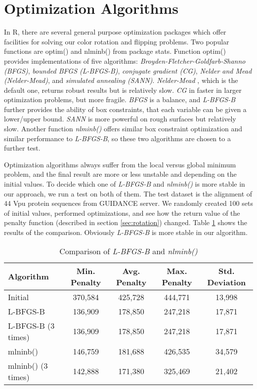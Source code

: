 \section{Optimization Algorithms}

In R, there are several general purpose optimization packages which offer facilities for solving our color rotation and flipping problems. Two popular functions are optim() and nlminb() from package stats. Function optim() provides implementations of five algorithms: \emph{Broyden-Fletcher-Goldfarb-Shanno (BFGS)}, \emph{bounded BFGS (L-BFGS-B)}, \emph{conjugate gradient (CG)}, \emph{Nelder and Mead (Nelder-Mead)}, and \emph{simulated annealing (SANN)}. \emph{Nelder-Mead} \cite{Nelder:1965aa}, which is the default one, returns robust results but is relatively slow. \emph{CG} \cite{Fletcher:1964aa} in faster in larger optimization problems, but more fragile. \emph{BFGS} is a balance, and \emph{L-BFGS-B} further provides the ability of box constraints, that each variable can be given a lower/upper bound. \emph{SANN} \cite{Belisle:1992aa} is more powerful on rough surfaces but relatively slow. Another function \emph{nlminb()} offers similar box constraint optimization and similar performance to \emph{L-BFGS-B}, so these two algorithms are chosen to a further test.

Optimization algorithms always suffer from the local versus global minimum problem, and the final result are more or less unstable and depending on the initial values. To decide which one of \emph{L-BFGS-B} and \emph{nlminb()} is more stable in our approach, we run a test on both of them. The test dataset is the alignment of 44 Vpu protein sequences from GUIDANCE server. \cite{Penn:2010ab} We randomly created 100 sets of initial values, performed optimizations, and see how the return value of the penalty function (described in section \ref{sec:rotation}) changed. Table \ref{tab:optim-comp} shows the results of the comparison. Obviously \emph{L-BFGS-B} is more stable in our algorithm.

\begin{table}[tp]
\caption{Comparison of \emph{L-BFGS-B} and \emph{nlminb()}}\label{tab:optim-comp}\centering\small
\begin{tabular}{lcccc} \toprule
  Algorithm             & Min. Penalty  & Avg. Penalty  & Max. Penalty  & Std. Deviation  \\ \hline
  Initial               & 370,584       & 425,728       & 444,771       & 13,998          \\
  L-BFGS-B              & 136,909       & 178,850       & 247,218       & 17,871          \\
  L-BFGS-B (3 times)  & 136,909       & 178,850       & 247,218       & 17,871          \\
  mlninb()              & 146,759       & 181,688       & 426,535       & 34,579          \\
  mlninb() (3 times)  & 142,888       & 171,380       & 325,469       & 21,402          \\ \bottomrule
\end{tabular}
\end{table}
